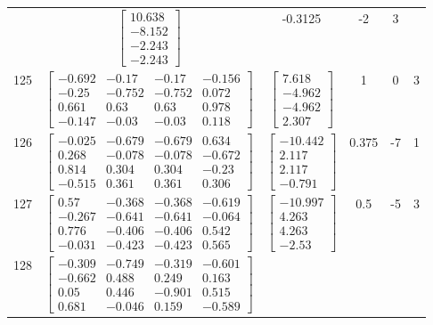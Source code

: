 \documentclass[a4paper,12pt]{article}
\begin{document}
\begin{tabular}{c c c c c c}
&
$\begin{bmatrix} 10.638 \\ -8.152 \\ -2.243 \\ -2.243 \end{bmatrix}$
&
-0.3125
&
-2
&
3
\\
125
&
$\begin{bmatrix} -0.692 & -0.17 & -0.17 & -0.156 \\ -0.25 & -0.752 & -0.752 & 0.072 \\ 0.661 & 0.63 & 0.63 & 0.978 \\ -0.147 & -0.03 & -0.03 & 0.118 \end{bmatrix}$
&
$\begin{bmatrix} 7.618 \\ -4.962 \\ -4.962 \\ 2.307 \end{bmatrix}$
&
1
&
0
&
3
\\
126
&
$\begin{bmatrix} -0.025 & -0.679 & -0.679 & 0.634 \\ 0.268 & -0.078 & -0.078 & -0.672 \\ 0.814 & 0.304 & 0.304 & -0.23 \\ -0.515 & 0.361 & 0.361 & 0.306 \end{bmatrix}$
&
$\begin{bmatrix} -10.442 \\ 2.117 \\ 2.117 \\ -0.791 \end{bmatrix}$
&
0.375
&
-7
&
1
\\
127
&
$\begin{bmatrix} 0.57 & -0.368 & -0.368 & -0.619 \\ -0.267 & -0.641 & -0.641 & -0.064 \\ 0.776 & -0.406 & -0.406 & 0.542 \\ -0.031 & -0.423 & -0.423 & 0.565 \end{bmatrix}$
&
$\begin{bmatrix} -10.997 \\ 4.263 \\ 4.263 \\ -2.53 \end{bmatrix}$
&
0.5
&
-5
&
3
\\
128
&
$\begin{bmatrix} -0.309 & -0.749 & -0.319 & -0.601 \\ -0.662 & 0.488 & 0.249 & 0.163 \\ 0.05 & 0.446 & -0.901 & 0.515 \\ 0.681 & -0.046 & 0.159 & -0.589 \end{bmatrix}$

\end{tabular}
\end{document}
